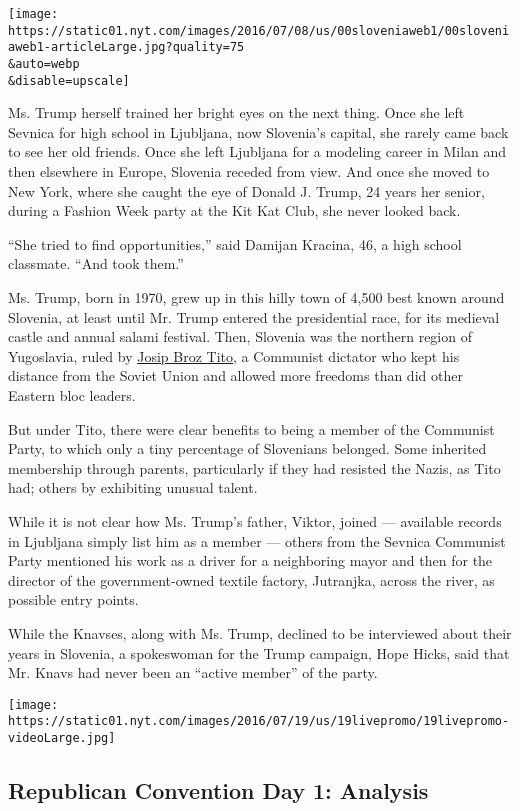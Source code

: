 \texttt{[image: https://static01.nyt.com/images/2016/07/08/us/00sloveniaweb1/00sloveniaweb1-articleLarge.jpg?quality=75\\\&auto=webp\\\&disable=upscale]}

Ms. Trump herself trained her bright eyes on the next thing. Once she
left Sevnica for high school in Ljubljana, now Slovenia's capital, she
rarely came back to see her old friends. Once she left Ljubljana for a
modeling career in Milan and then elsewhere in Europe, Slovenia receded
from view. And once she moved to New York, where she caught the eye of
Donald J. Trump, 24 years her senior, during a Fashion Week party at the
Kit Kat Club, she never looked back.

``She tried to find opportunities,'' said Damijan Kracina, 46, a high
school classmate. ``And took them.''

Ms. Trump, born in 1970, grew up in this hilly town of 4,500 best known
around Slovenia, at least until Mr. Trump entered the presidential race,
for its medieval castle and annual salami festival. Then, Slovenia was
the northern region of Yugoslavia, ruled by
\href{http://nyti.ms/29IAGb3}{Josip Broz Tito}, a Communist dictator who
kept his distance from the Soviet Union and allowed more freedoms than
did other Eastern bloc leaders.

But under Tito, there were clear benefits to being a member of the
Communist Party, to which only a tiny percentage of Slovenians belonged.
Some inherited membership through parents, particularly if they had
resisted the Nazis, as Tito had; others by exhibiting unusual talent.

While it is not clear how Ms. Trump's father, Viktor, joined ---
available records in Ljubljana simply list him as a member --- others
from the Sevnica Communist Party mentioned his work as a driver for a
neighboring mayor and then for the director of the government-owned
textile factory, Jutranjka, across the river, as possible entry points.

While the Knavses, along with Ms. Trump, declined to be interviewed
about their years in Slovenia, a spokeswoman for the Trump campaign,
Hope Hicks, said that Mr. Knavs had never been an ``active member'' of
the party.

\href{https://www.nytimes.com/interactive/2016/07/18/us/elections/gop-conventions-speakers.html}{}

\texttt{[image: https://static01.nyt.com/images/2016/07/19/us/19livepromo/19livepromo-videoLarge.jpg]}

\hypertarget{republican-convention-day-1-analysis}{%
\subsection{Republican Convention Day 1:
Analysis}\label{republican-convention-day-1-analysis}}

